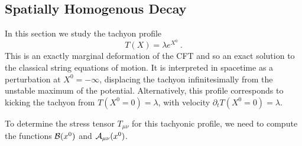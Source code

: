 \documentclass[a4paper,12pt]{article}
\def\p{\partial}
\begin{document}
 






\subsection{Spatially Homogenous Decay}
\label{homogenous} 
In this section we study the tachyon profile 
\begin{equation}
T(X)=\lambda e^{X^0}~.
\label{tachprofb}
\end{equation}
This is an exactly marginal deformation of the CFT and so an exact solution to the classical string equations of motion. 
It is interpreted in spacetime as a perturbation at $X^0=-\infty$, displacing the tachyon infinitesimally from the unstable maximum of the potential.  Alternatively, this profile 
corresponds to kicking the tachyon from $T(X^0=0)=\lambda$, with velocity $\p_tT(X^0=0) = \lambda$.  

To determine the stress tensor $T_{\mu \nu}$ for this tachyonic profile, we need to 
compute the functions ${\cal B}(x^0)$ and ${\cal A}_{\mu \nu}(x^0)$. 
\end{document}
